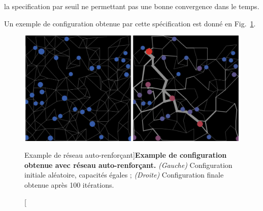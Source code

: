 la specification par seuil ne permettant pas une bonne convergence dans le temps.

Un exemple de configuration obtenue par cette spécification est donné en Fig.~\ref{fig:macrocoevolution:slimemould}.


\begin{figure}
	\includegraphics[width=\linewidth]{Figures/Final/6-2-3-fig-macrocoevol-slimemould}
	\caption[][Example de réseau auto-renforçant]{}{\textbf{Example de configuration obtenue avec réseau auto-renforçant.} \textit{(Gauche)} Configuration initiale aléatoire, capacités égales ; \textit{(Droite)} Configuration finale obtenue après 100 itérations.\label{fig:macrocoevolution:slimemould}}
\end{figure}










